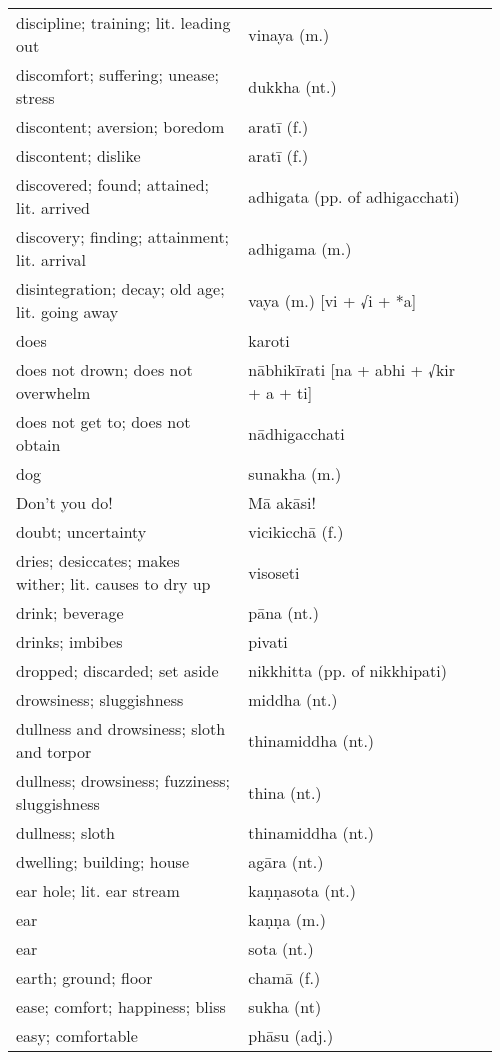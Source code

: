 \documentclass[a5paper]{memoir}
\begin{document}
\begin{longtable}{L{0.48\linewidth} L{0.48\linewidth} H}
discipline; training; lit. leading out & vinaya (m.) & \\[0pt]
discomfort; suffering; unease; stress & dukkha (nt.) & \\[0pt]
discontent; aversion; boredom & aratī (f.) & \\[0pt]
discontent; dislike & aratī (f.) & \\[0pt]
discovered; found; attained; lit. arrived & adhigata (pp. of adhigacchati) & \\[0pt]
discovery; finding; attainment; lit. arrival & adhigama (m.) & \\[0pt]
disintegration; decay; old age; lit. going away & vaya (m.) [vi + √i + *a] & \\[0pt]
does & karoti & \\[0pt]
does not drown; does not overwhelm & nābhikīrati [na + abhi + √kir + a + ti] & \\[0pt]
does not get to; does not obtain & nādhigacchati & \\[0pt]
dog & sunakha (m.) & \\[0pt]
Don't you do! & Mā akāsi! & \\[0pt]
doubt; uncertainty & vicikicchā (f.) & \\[0pt]
dries; desiccates; makes wither; lit. causes to dry up & visoseti & \\[0pt]
drink; beverage & pāna (nt.) & \\[0pt]
drinks; imbibes & pivati & \\[0pt]
dropped; discarded; set aside & nikkhitta (pp. of nikkhipati) & \\[0pt]
drowsiness; sluggishness & middha (nt.) & \\[0pt]
dullness and drowsiness; sloth and torpor & thinamiddha (nt.) & \\[0pt]
dullness; drowsiness; fuzziness; sluggishness & thina (nt.) & \\[0pt]
dullness; sloth & thinamiddha (nt.) & \\[0pt]
dwelling; building; house & agāra (nt.) & \\[0pt]
ear hole; lit. ear stream & kaṇṇasota (nt.) & \\[0pt]
ear & kaṇṇa (m.) & \\[0pt]
ear & sota (nt.) & \\[0pt]
earth; ground; floor & chamā (f.) & \\[0pt]
ease; comfort; happiness; bliss & sukha (nt) & \\[0pt]
easy; comfortable & phāsu (adj.) & \\[0pt]

\end{longtable}
\end{document}
